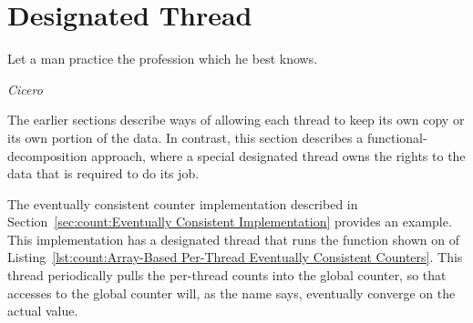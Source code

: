 \QuickQuizEnd

\section{Designated Thread}
\label{sec:owned:Designated Thread}
%
\epigraph{Let a man practice the profession which he best knows.}
	 {\emph{Cicero}}

The earlier sections describe ways of allowing each thread to keep its
own copy or its own portion of the data.
In contrast, this section describes a functional-decomposition approach,
where a special designated thread owns the rights to the data
that is required to do its job.
\begin{fcvref}
The eventually consistent counter implementation described in
Section~\ref{sec:count:Eventually Consistent Implementation} provides an example.
This implementation has a designated thread that runs the
 function shown on  of
Listing~\ref{lst:count:Array-Based Per-Thread Eventually Consistent Counters}.
This  thread periodically pulls the per-thread counts
into the global counter, so that accesses to the global counter will,
as the name says, eventually converge on the actual value.
\end{fcvref}

